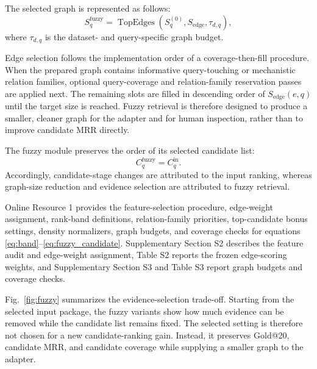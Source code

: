 \documentclass[pdflatex,sn-mathphys-num]{sn-jnl}
\newcommand{\figref}[1]{Fig.~\ref{#1}}
\begin{document}
The selected graph is represented as follows:
\begin{equation}
S^{\mathrm{fuzzy}}_q =
\operatorname{TopEdges}
\left(S^{(0)}_q,S_{\mathrm{edge}},\tau_{d,q}\right),
\label{eq:fuzzy_select}
\end{equation}
where $\tau_{d,q}$ is the dataset- and query-specific graph budget.

Edge selection follows the implementation order of a coverage-then-fill procedure.  When the prepared graph contains informative query-touching or mechanistic relation families, optional query-coverage and relation-family reservation passes are applied next. The remaining slots are filled in descending order of $S_{\mathrm{edge}}(e,q)$ until the target size is reached. Fuzzy retrieval is therefore designed to produce a smaller, cleaner graph for the adapter and for human inspection, rather than to improve candidate MRR directly.

The fuzzy module preserves the order of its selected candidate list:
\begin{equation}
C^{\mathrm{fuzzy}}_q=C^{\mathrm{in}}_q.
\label{eq:fuzzy_candidate}
\end{equation}
Accordingly, candidate-stage changes are attributed to the input ranking, whereas graph-size reduction and evidence selection are attributed to fuzzy retrieval. 

Online Resource 1 provides the feature-selection procedure, edge-weight assignment, rank-band definitions, relation-family priorities, top-candidate bonus settings, density normalizers, graph budgets, and coverage checks for equations \eqref{eq:band}--\eqref{eq:fuzzy_candidate}. Supplementary Section S2 describes the feature audit and edge-weight assignment, Table S2 reports the frozen edge-scoring weights, and Supplementary Section S3 and Table S3 report graph budgets and coverage checks.

\figref{fig:fuzzy} summarizes the evidence-selection trade-off. Starting from the selected input package, the fuzzy variants show how much evidence can be removed while the candidate list remains fixed. The selected setting is therefore not chosen for a new candidate-ranking gain. Instead, it preserves Gold@20, candidate MRR, and candidate coverage while supplying a smaller graph to the adapter.
\end{document}

